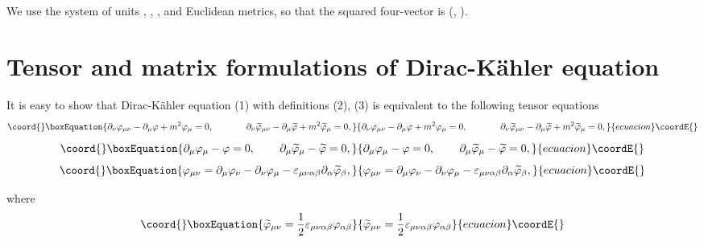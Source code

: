 \documentclass[a4paper,12pt]{article}
\begin{document}
We use the system of units \coordHE{}, \coordHE{}, \coordHE{}, and Euclidean metrics, so that the squared
four-vector is \coordHE{}
(\coordHE{}, \coordHE{}).

\section{Tensor and matrix formulations of Dirac-K\"ahler
equation}

It is easy to show that Dirac-K\"ahler equation (1) with definitions (2),
(3) is equivalent to the following tensor equations
\begin{equation}\coord{}\boxEquation{
\partial _\nu \varphi _{\mu \nu }-\partial _\mu \varphi +m^2\varphi _\mu
=0 ,\hspace{0.5in}\partial _\nu \widetilde{\varphi }_{\mu \nu
}-\partial _\mu \widetilde{\varphi }+m^2\widetilde{\varphi }_\mu
=0  ,\label{5}
}{
\partial _\nu \varphi _{\mu \nu }-\partial _\mu \varphi +m^2\varphi _\mu
=0 ,\hspace{0.5in}\partial _\nu \widetilde{\varphi }_{\mu \nu
}-\partial _\mu \widetilde{\varphi }+m^2\widetilde{\varphi }_\mu
=0  ,}{ecuacion}\coordE{}\end{equation}
\begin{equation}\coord{}\boxEquation{
\partial _\mu \varphi _\mu -\varphi =0 ,\hspace{0.3in}\partial _\mu \widetilde{
\varphi }_\mu -\widetilde{\varphi }=0 , \label{6}
}{
\partial _\mu \varphi _\mu -\varphi =0 ,\hspace{0.3in}\partial _\mu \widetilde{
\varphi }_\mu -\widetilde{\varphi }=0 , }{ecuacion}\coordE{}\end{equation}
\begin{equation}\coord{}\boxEquation{
\varphi _{\mu \nu }=\partial _\mu \varphi _\nu -\partial _\nu
\varphi _\mu -\varepsilon _{\mu \nu \alpha \beta }\partial _\alpha
\widetilde{\varphi } _\beta , \label{7}
}{
\varphi _{\mu \nu }=\partial _\mu \varphi _\nu -\partial _\nu
\varphi _\mu -\varepsilon _{\mu \nu \alpha \beta }\partial _\alpha
\widetilde{\varphi } _\beta , }{ecuacion}\coordE{}\end{equation}

where
\begin{equation}\coord{}\boxEquation{
\widetilde{\varphi }_{\mu \nu }=\frac 12\varepsilon _{\mu \nu \alpha \beta
}\varphi _{\alpha \beta }  \label{8}
}{
\widetilde{\varphi }_{\mu \nu }=\frac 12\varepsilon _{\mu \nu \alpha \beta
}\varphi _{\alpha \beta }  }{ecuacion}\coordE{}\end{equation}
\end{document}
